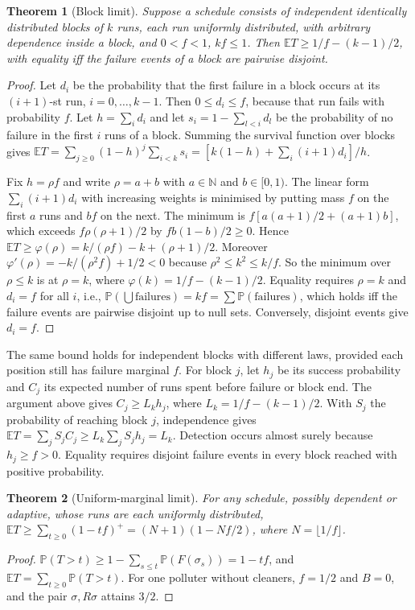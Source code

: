 \documentclass[11pt,a4paper]{article}
\newtheorem{theorem}{Theorem}[section]
\theoremstyle{definition}\newtheorem{definition}[theorem]{Definition}
\theoremstyle{remark}\newtheorem{remark}[theorem]{Remark}
\newcommand{\E}{\mathbb E}
\newcommand{\Prb}{\mathbb P}
\theoremstyle{definition}\newtheorem{xexample}[xtheorem]{Example}\theoremstyle{plain}
\begin{document}
\begin{theorem}[Block limit]
Suppose a schedule consists of independent identically distributed blocks of $k$ runs, each run uniformly distributed, with arbitrary dependence inside a block, and $0<f<1$, $kf\le1$. Then $\E T\ge1/f-(k-1)/2$, with equality iff the failure events of a block are pairwise disjoint.
\end{theorem}
\begin{proof}
Let $d_i$ be the probability that the first failure in a block occurs at its $(i{+}1)$-st run, $i=0,\dots,k-1$. Then $0\le d_i\le f$, because that run fails with probability $f$. Let $h=\sum_i d_i$ and let $s_i=1-\sum_{l<i}d_l$ be the probability of no failure in the first $i$ runs of a block. Summing the survival function over blocks gives $\E T=\sum_{j\ge0}(1-h)^j\sum_{i<k}s_i=[k(1-h)+\sum_i(i+1)d_i]/h$.

Fix $h=\rho f$ and write $\rho=a+b$ with $a\in\mathbb N$ and $b\in[0,1)$. The linear form $\sum_i(i+1)d_i$ with increasing weights is minimised by putting mass $f$ on the first $a$ runs and $bf$ on the next. The minimum is $f[a(a+1)/2+(a+1)b]$, which exceeds $f\rho(\rho+1)/2$ by $fb(1-b)/2\ge0$. Hence $\E T\ge\varphi(\rho)=k/(\rho f)-k+(\rho+1)/2$. Moreover $\varphi'(\rho)=-k/(\rho^2f)+1/2<0$ because $\rho^2\le k^2\le k/f$. So the minimum over $\rho\le k$ is at $\rho=k$, where $\varphi(k)=1/f-(k-1)/2$. Equality requires $\rho=k$ and $d_i=f$ for all $i$, i.e., $\Prb(\bigcup\text{failures})=kf=\sum\Prb(\text{failures})$, which holds iff the failure events are pairwise disjoint up to null sets. Conversely, disjoint events give $d_i=f$.
\end{proof}

The same bound holds for independent blocks with different laws, provided each position still has failure marginal $f$. For block $j$, let $h_j$ be its success probability and $C_j$ its expected number of runs spent before failure or block end. The argument above gives $C_j\ge L_k h_j$, where $L_k=1/f-(k-1)/2$. With $S_j$ the probability of reaching block $j$, independence gives $\E T=\sum_j S_jC_j\ge L_k\sum_j S_jh_j=L_k$. Detection occurs almost surely because $h_j\ge f>0$. Equality requires disjoint failure events in every block reached with positive probability.

\begin{theorem}[Uniform-marginal limit]
For any schedule, possibly dependent or adaptive, whose runs are each uniformly distributed, $\E T\ge\sum_{t\ge0}(1-tf)^+=(N+1)(1-Nf/2)$, where $N=\lfloor1/f\rfloor$.
\end{theorem}
\begin{proof}
$\Prb(T>t)\ge1-\sum_{s\le t}\Prb(F(\sigma_s))=1-tf$, and $\E T=\sum_{t\ge0}\Prb(T>t)$. For one polluter without cleaners, $f=1/2$ and $B=0$, and the pair $\sigma,R\sigma$ attains $3/2$.
\end{proof}
\end{document}
